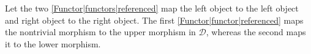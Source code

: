 Let the two \ref{Functor|functors|referenced} map the left object to the left object and right object to the right object. The first \ref{Functor|functor|referenced} maps the nontrivial morphism to the upper morphism in $\mathcal{D}$, whereas the second maps it to the lower morphism.
